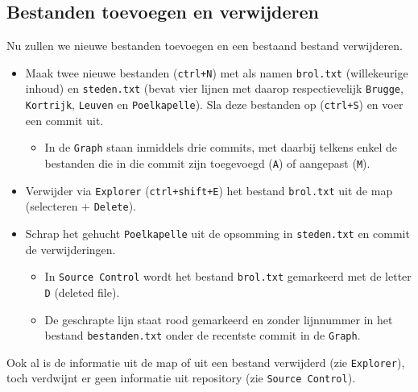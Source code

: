 \documentclass[kulak]{kulakarticle} %
\begin{document}
	\subsection{Bestanden toevoegen en verwijderen} Nu zullen we nieuwe bestanden toevoegen en een bestaand bestand verwijderen.
	\begin{itemize}
		\item Maak twee nieuwe bestanden (\texttt{ctrl+N}) met als namen \texttt{brol.txt} (willekeurige inhoud) en \texttt{steden.txt} (bevat vier lijnen met daarop respectievelijk \texttt{Brugge}, \texttt{Kortrijk}, \texttt{Leuven} en \texttt{Poelkapelle}). Sla deze bestanden op (\texttt{ctrl+S}) en voer een commit uit.
		\begin{itemize}
			\item In de \texttt{Graph} staan inmiddels drie commits, met daarbij telkens enkel de bestanden die in die commit zijn toegevoegd (\texttt{A}) of aangepast (\texttt{M}).
		\end{itemize}
		\item Verwijder via \texttt{Explorer} (\texttt{ctrl+shift+E}) het bestand \texttt{brol.txt} uit de map (selecteren + \texttt{Delete}).
		\item Schrap het gehucht \texttt{Poelkapelle} uit de opsomming in \texttt{steden.txt} en commit de verwijderingen.
		\begin{itemize}
			\item In \texttt{Source Control} wordt het bestand \texttt{brol.txt} gemarkeerd met de letter \texttt{D} (deleted file).
			\item De geschrapte lijn staat rood gemarkeerd en zonder lijnnummer in het bestand \texttt{bestanden.txt} onder de recentste commit in de \texttt{Graph}.
		\end{itemize}
	\end{itemize}
	Ook al is de informatie uit de map of uit een bestand verwijderd (zie \texttt{Explorer}), toch verdwijnt er geen informatie uit repository (zie \texttt{Source Control}).
	
\end{document}
